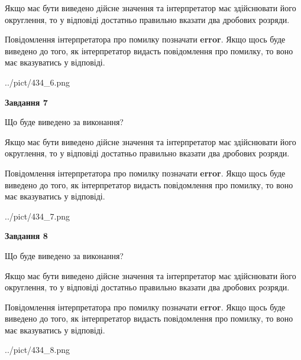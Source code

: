 \documentclass[12pt, ukrainian]{article}
\begin{document}
{\begin {Large}
Якщо має бути виведено дійсне значення та інтерпретатор має здійснювати його округлення, 
то у відповіді достатньо правильно вказати два дробових розряди.

Повідомлення інтерпретатора про помилку позначати \textbf{error}.
Якщо щось буде виведено до того, як інтерпретатор видасть повідомлення про помилку, 
то воно має вказуватись у відповіді. \par

\begin{center}
	{../pict/434_6.png}
\end{center}
\newpage

{\begin {center}\textbf{Завдання 7}\end {center}}\par
Що буде виведено за виконання? \par

Якщо має бути виведено дійсне значення та інтерпретатор має здійснювати його округлення, 
то у відповіді достатньо правильно вказати два дробових розряди.

Повідомлення інтерпретатора про помилку позначати \textbf{error}.
Якщо щось буде виведено до того, як інтерпретатор видасть повідомлення про помилку, 
то воно має вказуватись у відповіді. \par

\begin{center}
	{../pict/434_7.png}
\end{center}
\newpage

{\begin {center}\textbf{Завдання 8}\end {center}}\par
Що буде виведено за виконання? \par

Якщо має бути виведено дійсне значення та інтерпретатор має здійснювати його округлення, 
то у відповіді достатньо правильно вказати два дробових розряди.

Повідомлення інтерпретатора про помилку позначати \textbf{error}.
Якщо щось буде виведено до того, як інтерпретатор видасть повідомлення про помилку, 
то воно має вказуватись у відповіді. \par

\begin{center}
	{../pict/434_8.png}
\end{center}
\newpage


\end{Large}}
\end{document}
